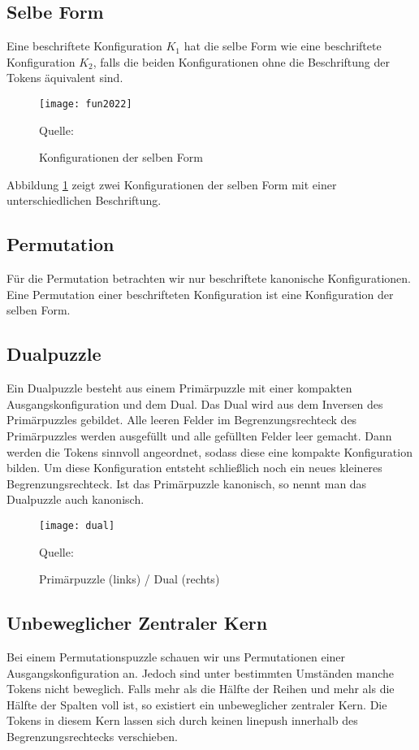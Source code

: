 \documentclass[seminar,german]{algothesis}
\newcommand*{\quelle}{%
  \footnotesize Quelle:
}
\begin{document}
\subsection{Selbe Form}
\begin{definition}
Eine beschriftete Konfiguration $K_1$ hat die selbe Form wie eine beschriftete Konfiguration $K_2$, falls die beiden Konfigurationen ohne die Beschriftung der Tokens äquivalent sind.
\end{definition}
\begin{figure}[ht]
	\centering
	\texttt{[image: fun2022]}
	\caption{Konfigurationen der selben Form}
	\quelle \cite{akitaya2022pushing}
	\label{fig:10}
\end{figure}
\noindent Abbildung \ref{fig:10} zeigt zwei Konfigurationen der selben Form mit einer unterschiedlichen Beschriftung. 
\subsection{Permutation}
\begin{definition}
Für die Permutation betrachten wir nur beschriftete kanonische Konfigurationen. Eine Permutation einer beschrifteten Konfiguration ist eine Konfiguration der selben Form.
\end{definition}
\subsection{Dualpuzzle}
Ein Dualpuzzle besteht aus einem Primärpuzzle mit einer kompakten Ausgangskonfiguration und dem Dual. Das Dual wird aus dem Inversen des Primärpuzzles gebildet. Alle leeren Felder im Begrenzungsrechteck des Primärpuzzles werden ausgefüllt und alle gefüllten Felder leer gemacht. Dann werden die Tokens sinnvoll angeordnet, sodass diese eine kompakte Konfiguration bilden. Um diese Konfiguration entsteht schließlich noch ein neues kleineres Begrenzungsrechteck. Ist das Primärpuzzle kanonisch, so nennt man das Dualpuzzle auch kanonisch.

\begin{figure}[ht]
	\centering
	\texttt{[image: dual]}
	\caption{Primärpuzzle (links) / Dual (rechts)}
	\quelle \cite{akitaya2022pushing}
	\label{fig:11}
\end{figure}

\newpage
\subsection{Unbeweglicher Zentraler Kern}
Bei einem Permutationspuzzle schauen wir uns Permutationen einer Ausgangskonfiguration an. Jedoch sind unter bestimmten Umständen manche Tokens nicht beweglich. Falls mehr als die Hälfte der Reihen und mehr als die Hälfte der Spalten voll ist, so existiert ein unbeweglicher zentraler Kern. Die Tokens in diesem Kern lassen sich durch keinen linepush innerhalb des Begrenzungsrechtecks verschieben.
\end{document}
